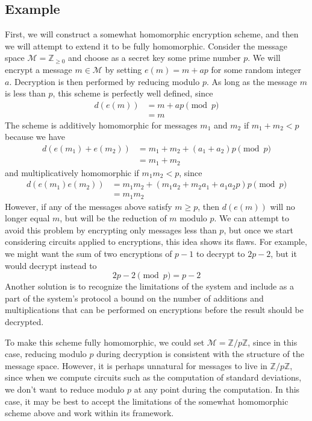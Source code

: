 \documentclass[11pt]{report}
\newcommand{\Z}{\mathbb{Z}}
\newcommand{\M}{\mathcal{M}}
\newcommand{\Zp}{\mathbb{Z}/p\mathbb{Z}}
\begin{document}
\subsection{Example}
\label{Example2}First, we will construct a somewhat homomorphic encryption scheme, and then we will attempt to extend it to be fully homomorphic. Consider the message space $\M = \Z_{\geq 0}$ and choose as a secret key some prime number $p$. We will encrypt a message $m\in \M$ by setting $e(m) = m+ap$ for some random integer $a$. Decryption is then performed by reducing modulo $p$. As long as the message $m$ is less than $p$, this scheme is perfectly well defined, since
\begin{align*}
d(e(m)) &= m+ap \pmod{p}\\
              &= m
\end{align*}
The scheme is additively homomorphic for messages $m_1$ and $m_2$ if $m_1+m_2<p$ because we have
\begin{align*}
d(e(m_1)+e(m_2)) &= m_1+m_2+(a_1+a_2)p \pmod{p}\\
&= m_1+m_2
\end{align*}
and multiplicatively homomorphic if $m_1m_2<p$, since
\begin{align*}
d(e(m_1)e(m_2)) &= m_1m_2+(m_1a_2+m_2a_1+a_1a_2p)p \pmod{p}\\
&= m_1m_2
\end{align*}
However, if any of the messages above satisfy $m\geq p$, then $d(e(m))$ will no longer equal $m$, but will be the reduction of $m$ modulo $p$. We can attempt to avoid this problem by encrypting only messages less than $p$, but once we start considering circuits applied to encryptions, this idea shows its flaws. For example, we might want the sum of two encryptions of $p-1$ to decrypt to $2p-2$, but it would decrypt instead to
\[2p-2 \pmod{p} = p-2 \]
Another solution is to recognize the limitations of the system and include as a part of the system's protocol a bound on the number of additions and multiplications that can be performed on encryptions before the result should be decrypted. 

To make this scheme fully homomorphic, we could set $\M = \Zp$, since in this case, reducing modulo $p$ during decryption is consistent with the structure of the message space. However, it is perhaps unnatural for messages to live in $\Zp$, since when we compute circuits such as the computation of standard deviations, we don't want to reduce modulo $p$ at any point during the computation. In this case, it may be best to accept the limitations of the somewhat homomorphic scheme above and work within its framework.
\end{document}
